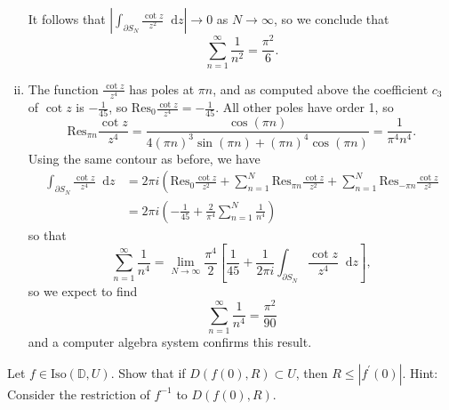 \documentclass{article}
\newcommand\Res{\mathrm{Res}}
\newcommand\dif{\mathop{}\!\mathrm{d}}
\newcounter{Problem}
\newenvironment{Problem}{\begin{Exercise}[name={Problem},
                                          counter={Problem}]}
                        {\end{Exercise}}
\begin{document}
\begin{Answer}
\begin{enumerate}[(i)]
{      It follows that
      $
      \left|
        \int_{\partial S_N}
          \frac{\cot z}{z^2}
          \dif z
      \right| \to 0$ as $N \to \infty$, so we conclude that
      $$
      \sum_{n=1}^\infty \frac{1}{n^2} = \frac{\pi^2}{6}.
      $$
    }
    \item{
      The function $\frac{\cot z}{z^4}$ has poles at $\pi n$,
      and as computed above the coefficient $c_3$ of $\cot z$
      is $-\frac{1}{45}$, so
      $\Res_0 \frac{\cot z}{z^4} = -\frac{1}{45}$. All other poles
      have order 1, so
      $$
        \Res_{\pi n} \frac{\cot z}{z^4}
      = \frac{\cos (\pi n)}
             { 4(\pi n)^3 \sin (\pi n)
             + (\pi n)^4 \cos (\pi n)}
      = \frac{1}{\pi^4 n^4}.
      $$
      Using the same contour as before, we have
      \begin{align*}
         \int_{\partial S_N}
           \frac{\cot z}{z^4}
           \dif z
      &= 2 \pi i
         \left(
           \Res_0 \frac{\cot z}{z^2}
         + \sum_{n=1}^N
             \Res_{\pi n}
               \frac{\cot z}{z^2}
         + \sum_{n=1}^N
             \Res_{-\pi n}
               \frac{\cot z}{z^2}\\
      &= 2 \pi i
         \left(
         - \frac{1}{45}
         + \frac{2}{\pi^4}
           \sum_{n=1}^N
             \frac{1}{n^4}
         \right)
      \end{align*}
      so that
      $$
        \sum_{n=1}^\infty
          \frac{1}{n^4}
      = \lim_{N \to \infty}
          \frac{\pi^4}{2}
          \left[
            \frac{1}{45}
          + \frac{1}{2 \pi i}
            \int_{\partial S_N}
              \frac{\cot z}{z^4}
              \dif z
          \right],
      $$
      so we expect to find
      $$
        \sum_{n=1}^\infty
          \frac{1}{n^4}
      = \frac{\pi^2}{90}
      $$
      and a computer algebra system confirms this result.
    }
  \end{enumerate}
\end{Answer}

\begin{Problem}
Let $f \in \mathrm{Iso}(\mathbb{D}, U)$. Show that if
$D(f(0), R) \subset U$, then $R \leq |f^\prime(0)|$.
Hint: Consider the restriction of $f^{-1}$ to $D(f(0), R)$.
\end{Problem}
\end{document}
